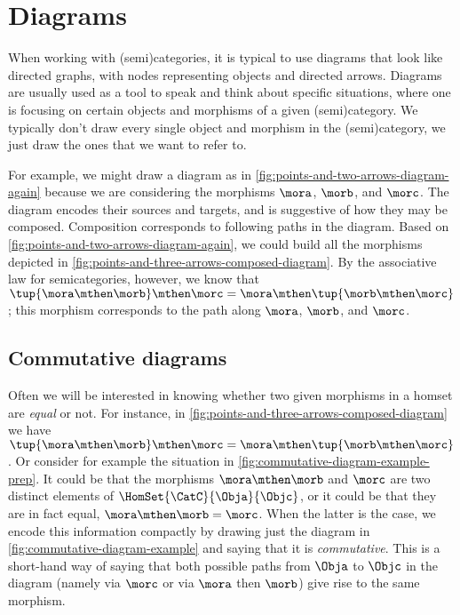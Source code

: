 
\section{Diagrams}

When working with (semi)categories, it is typical to use diagrams that look like directed graphs, with nodes representing objects and directed arrows.
Diagrams are usually used as a tool to speak and think about specific situations, where one is focusing on certain objects and morphisms of a given (semi)category.
We typically don't draw every single object and morphism in the (semi)category, we just draw the ones that we want to refer to.

\begin{marginfigure}
    \centering
    \caption{}
    \label{fig:points-and-three-arrows-diagram}
\end{marginfigure}

\begin{marginfigure}
    \centering
    \caption{}
    \label{fig:points-and-three-arrows-composed-diagram}
\end{marginfigure}

For example, we might draw a diagram as in \cref{fig:points-and-two-arrows-diagram-again} because we are considering the morphisms $\mora$, $\morb$, and $\morc$.
The diagram encodes their sources and targets, and is suggestive of how they may be composed.
Composition corresponds to following paths in the diagram.
Based on \cref{fig:points-and-two-arrows-diagram-again}, we could build all the morphisms depicted in \cref{fig:points-and-three-arrows-composed-diagram}.
By the associative law for semicategories, however, we know that $\tup{\mora \mthen \morb} \mthen \morc = \mora \mthen \tup{\morb \mthen \morc}$; this morphism corresponds to the path along $\mora$, $\morb$, and $\morc$.

\subsection{Commutative diagrams}

Often we will be interested in knowing whether two given morphisms in a homset are \emph{equal} or not.
For instance, in \cref{fig:points-and-three-arrows-composed-diagram} we have $\tup{\mora \mthen \morb} \mthen \morc = \mora \mthen \tup{\morb \mthen \morc}$.
Or consider for example the situation in \cref{fig:commutative-diagram-example-prep}.
It could be that the morphisms $\mora \mthen \morb$ and $\morc$ are two distinct elements of $\HomSet{\CatC}{\Obja}{\Objc}$, or it could be that they are in fact equal,  $\mora \mthen \morb = \morc$.
When the latter is the case, we encode this information compactly by drawing just the diagram in \cref{fig:commutative-diagram-example} and saying that it is \emph{commutative}.
This is a short-hand way of saying that both possible paths from $\Obja$ to $\Objc$ in the diagram (namely via $\morc$ or via $\mora$ then $\morb$) give rise to the same morphism.

